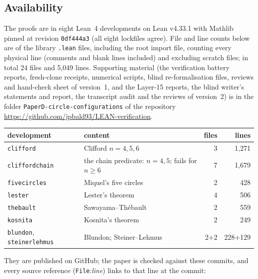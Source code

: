 \documentclass[11pt]{article}
\theoremstyle{definition}
\theoremstyle{remark}
\newcommand{\lean}[1]{\texttt{#1}}
\begin{document}
\subsection{Availability}\label{sec:avail}
The proofs are in eight Lean~4 developments on Lean v4.33.1 with Mathlib pinned at revision
\texttt{0df444a3} (all eight lockfiles agree). File and line counts below are of the library
\lean{.lean} files, including the root import file, counting every physical line (comments and blank
lines included) and excluding scratch files; in total 24 files and 5{,}049 lines.
Supporting material (the verification battery reports, fresh-clone receipts, numerical scripts, blind re-formalisation files, reviews and hand-check sheet of version~1, and the Layer-15 reports, the blind writer's statements and report, the transcript audit and the reviews of version~2) is in the folder \texttt{PaperD-circle-configurations} of the repository \url{https://github.com/jpbald93/LEAN-verification}.
\begin{center}\small
\begin{tabular}{llrr}
\toprule
development & content & files & lines\\
\midrule
\lean{clifford} & Clifford $n=4,5,6$ & 3 & 1{,}271\\
\lean{cliffordchain} & the chain predicate: $n=4,5$; fails for $n\ge6$ & 7 & 1{,}679\\
\lean{fivecircles} & Miquel's five circles & 2 & 428\\
\lean{lester} & Lester's theorem & 4 & 506\\
\lean{thebault} & Sawayama--Th\'ebault & 2 & 559\\
\lean{kosnita} & Kosnita's theorem & 2 & 249\\
\lean{blundon}, \lean{steinerlehmus} & Blundon; Steiner--Lehmus & 2+2 & 228+129\\
\bottomrule
\end{tabular}
\end{center}
They are published on GitHub; the paper is checked against these commits, and every source reference
(\texttt{File}:\textit{line}) links to that line at the commit:
\end{document}
